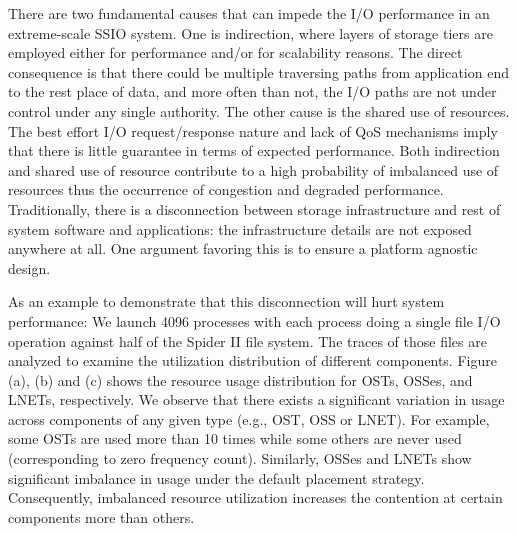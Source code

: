 There are two fundamental causes that can impede the I/O performance
in an extreme-scale SSIO system. One is indirection, where layers
of storage tiers are employed either for performance and/or for
scalability reasons.  The direct consequence is that there could
be multiple traversing paths from application end to the rest place
of data, and more often than not, the I/O paths are not under control
under any single authority. The other cause is the shared use of
resources. The best effort I/O request/response nature and lack of
QoS mechanisms imply that there is little guarantee in terms of
expected performance.  Both indirection and shared use of resource
contribute to a high probability of imbalanced use of resources
thus the occurrence of congestion and degraded performance.
Traditionally, there is a disconnection between storage infrastructure
and rest of system software and applications: the infrastructure
details are not exposed anywhere at all. One argument favoring this
is to ensure a platform agnostic design.

As an example to demonstrate that this disconnection will hurt
system performance: We launch 4096 processes with each process doing
a single file I/O operation against half of the Spider II file
system. The traces of those files are analyzed to examine the
utilization distribution of different components. Figure (a), (b)
and (c) shows the resource usage distribution for OSTs, OSSes, and
LNETs, respectively. We observe that there exists a significant
variation in usage across components of any given type (e.g., OST,
OSS or LNET). For example, some OSTs are used more than 10 times
while some others are never used (corresponding to zero frequency
count). Similarly, OSSes and LNETs show significant imbalance in
usage under the default placement strategy. Consequently, imbalanced
resource utilization increases the contention at certain components
more than others.



